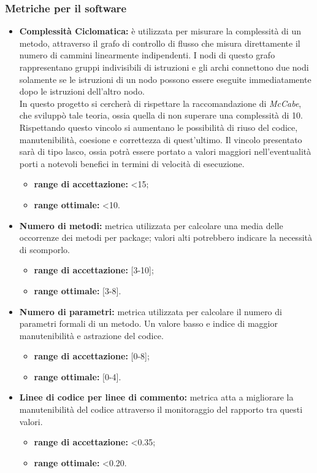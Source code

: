 		\subsubsection{Metriche per il software}
			\begin{itemize}
				\item \textbf{Complessità Ciclomatica:} è utilizzata per misurare la complessità di un metodo, attraverso il grafo di controllo di flusso che misura direttamente il numero di cammini linearmente indipendenti. I nodi di questo grafo rappresentano gruppi indivisibili di istruzioni e gli archi connettono due nodi solamente se le istruzioni di un nodo possono essere eseguite immediatamente dopo le istruzioni dell'altro nodo.\\
				In questo progetto si cercherà di rispettare la raccomandazione di \textit{McCabe}, che sviluppò tale teoria, ossia quella di non superare una complessità di 10. Rispettando questo vincolo si aumentano le possibilità di riuso del codice, manutenibilità, coesione e correttezza di quest'ultimo. Il vincolo presentato sarà di tipo lasco, ossia potrà essere portato a valori maggiori nell'eventualità porti a notevoli benefici in termini di velocità di esecuzione.
				\begin{itemize}
					\item \textbf{range di accettazione:} <15;
					\item \textbf{range ottimale:} <10.
				\end{itemize}				
				\item \textbf{Numero di metodi:} metrica utilizzata per calcolare una media delle occorrenze dei metodi per package; valori alti potrebbero indicare la necessità di scomporlo. 					\begin{itemize}
					\item \textbf{range di accettazione:} [3-10];
					\item \textbf{range ottimale:} [3-8].
				\end{itemize}
				
				\item \textbf{Numero di parametri:} metrica utilizzata per calcolare il numero di parametri formali di un metodo. Un valore basso e indice di maggior manutenibilità e astrazione del codice.
				\begin{itemize}
					\item \textbf{range di accettazione:} [0-8];
					\item \textbf{range ottimale:} [0-4].
				\end{itemize}
				\item \textbf{Linee di codice per linee di commento:} metrica atta a migliorare la manutenibilità del codice attraverso il monitoraggio del rapporto tra questi valori.
				\begin{itemize}
					\item \textbf{range di accettazione:} <0.35;
					\item \textbf{range ottimale:} <0.20.
				\end{itemize}				
				

\end{itemize}
